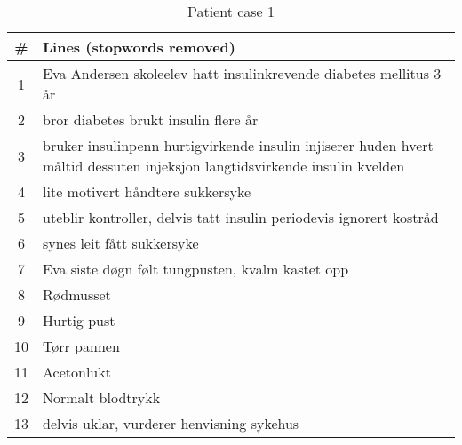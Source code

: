 \begin{table}[htbp] \footnotesize \center
\caption[Patient case 1 to 8]{Patient case 1\label{tab:case1}}
\begin{tabularx}{\textwidth}{c X}
    \toprule
    \# & Lines (stopwords removed) \\
    \midrule
    1 & Eva Andersen skoleelev hatt insulinkrevende diabetes mellitus 3 år \\
    2 & bror diabetes brukt insulin flere år \\
    3 & bruker insulinpenn hurtigvirkende insulin injiserer huden hvert måltid dessuten injeksjon langtidsvirkende insulin kvelden \\
    4 & lite motivert håndtere sukkersyke \\
    5 & uteblir kontroller, delvis tatt insulin periodevis ignorert kostråd \\
    6 & synes leit fått sukkersyke \\
    7 & Eva siste døgn følt tungpusten, kvalm kastet opp \\
    8 & Rødmusset \\
    9 & Hurtig pust \\
    10 & Tørr pannen \\
    11 & Acetonlukt \\
    12 & Normalt blodtrykk \\
    13 & delvis uklar, vurderer henvisning sykehus \\
    \bottomrule
\end{tabularx}
\end{table}

